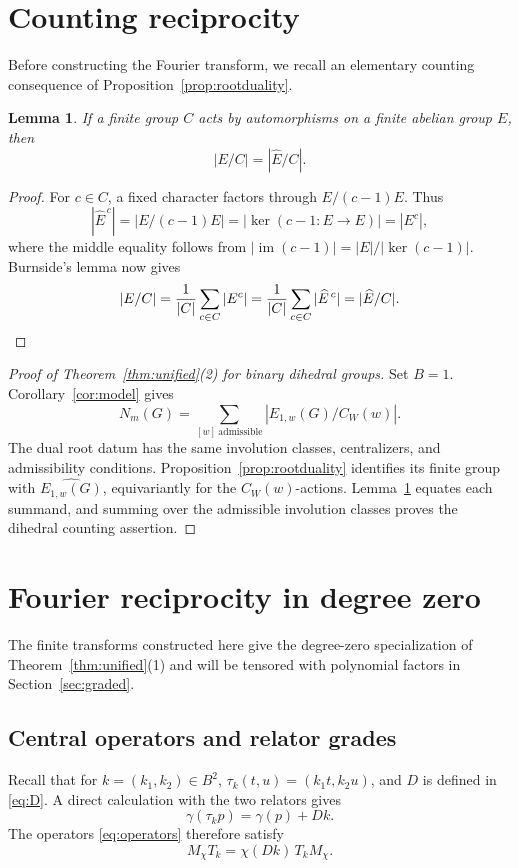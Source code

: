 \documentclass[11pt,a4paper,reqno]{amsart}
\theoremstyle{plain}
\newtheorem{lemma}[theorem]{Lemma}
\theoremstyle{definition}
\theoremstyle{remark}
\numberwithin{equation}{section}
\DeclareMathOperator{\im}{im}
\begin{document}
\section{Counting reciprocity}\label{sec:count}

Before constructing the Fourier transform, we recall an elementary counting consequence of Proposition~\ref{prop:rootduality}.

\begin{lemma}\label{lem:burnside} If a finite group $C$ acts by automorphisms on a finite abelian group $E$, then
\[
|E/C|=|\widehat E/C|.
\]
\end{lemma}
\begin{proof}
For $c\in C$, a fixed character factors through $E/(c-1)E$. Thus
\[
|\widehat E^{\,c}|=|E/(c-1)E|=|\ker(c-1\colon E\to E)|=|E^c|,
\]
where the middle equality follows from $|\im(c-1)|=|E|/|\ker(c-1)|$. Burnside's lemma now gives
\[
|E/C|=\frac1{|C|}\sum_{c\in C}|E^c| =\frac1{|C|}\sum_{c\in C}|\widehat E^{\,c}|=|\widehat E/C|.\qedhere
\]
\end{proof}

\begin{proof}[Proof of Theorem~\ref{thm:unified}\textup{(2)} for binary dihedral groups]
Set $B=1$. Corollary~\ref{cor:model} gives
\[
N_m(G)=\sum_{[w]\ \mathrm{admissible}}|E_{1,w}(G)/C_W(w)|.
\]
The dual root datum has the same involution classes, centralizers, and admissibility conditions. Proposition~\ref{prop:rootduality} identifies its finite group with $\widehat{E_{1,w}(G)}$, equivariantly for the $C_W(w)$-actions. Lemma~\ref{lem:burnside} equates each summand, and summing over the admissible involution classes proves the dihedral counting assertion.
\end{proof}

\section{Fourier reciprocity in degree zero}\label{sec:fourier}

The finite transforms constructed here give the degree-zero specialization of Theorem~\ref{thm:unified}\textup{(1)} and will be tensored with polynomial factors in Section~\ref{sec:graded}.

\subsection{Central operators and relator grades}

Recall that for $k=(k_1,k_2)\in B^2$, $\tau_k(t,u)=(k_1t,k_2u)$, and $D$ is defined in \eqref{eq:D}. A direct calculation with the two relators gives
\begin{equation}\label{eq:gradechange}
\gamma(\tau_k p)=\gamma(p)+Dk.
\end{equation}
The operators \eqref{eq:operators} therefore satisfy
\begin{equation}\label{eq:heisenberg}
M_\chi T_k=\chi(Dk)\,T_kM_\chi.
\end{equation}
\end{document}
